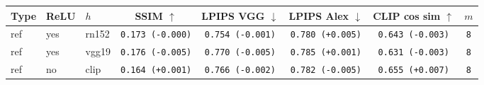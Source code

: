 \begin{tabular}{|l|l|l|c|c|c|c|c|}
\hline
Type & ReLU & $h$ & SSIM $\uparrow$ & LPIPS VGG $\downarrow$ & LPIPS Alex $\downarrow$ & CLIP cos sim $\uparrow$ & $m$ \\
\hline
ref & yes & rn152 & \texttt{0.173 {\color{black}(-0.000)}} & \texttt{0.754 {\color{green}(-0.001)}} & \texttt{0.780 {\color{red}(+0.005)}} & \texttt{0.643 {\color{red}(-0.003)}} & \texttt{8} \\
\hline
ref & yes & vgg19 & \texttt{0.176 {\color{red}(-0.005)}} & \texttt{0.770 {\color{green}(-0.005)}} & \texttt{0.785 {\color{red}(+0.001)}} & \texttt{0.631 {\color{red}(-0.003)}} & \texttt{8} \\
\hline
ref & no & clip & \texttt{0.164 {\color{green}(+0.001)}} & \texttt{0.766 {\color{green}(-0.002)}} & \texttt{0.782 {\color{green}(-0.005)}} & \texttt{0.655 {\color{green}(+0.007)}} & \texttt{8} \\
\hline
\end{tabular}
